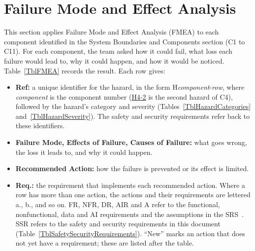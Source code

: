 \documentclass{article}
\newcommand{\hazref}[1]{\hyperref[haz:#1]{#1}}
\begin{document}
\section{Failure Mode and Effect Analysis} \label{sec_FMEA}


This section applies Failure Mode and Effect Analysis (FMEA) to each component
identified in the System Boundaries and Components section (C1 to C11). For each component,
the team asked how it could fail, what loss each failure would lead to, why it
could happen, and how it would be noticed. Table~\ref{TblFMEA} records the
result. Each row gives:

\begin{itemize}
  \item \textbf{Ref:} a unique identifier for the hazard, in the form
    H\textit{component}-\textit{row}, where \textit{component} is the
    component number (\hazref{H4-2} is the second hazard of C4), followed by the hazard's category and
    severity (Tables~\ref{TblHazardCategories} and~\ref{TblHazardSeverity}).
    The safety and security requirements refer back to these identifiers.
  \item \textbf{Failure Mode, Effects of Failure, Causes of Failure:} what goes
    wrong, the loss it leads to, and why it could happen.
  \item \textbf{Recommended Action:} how the failure is prevented or its effect
    is limited.
  \item \textbf{Req.:} the requirement that implements each recommended action.
    Where a row has more than one action, the actions and their requirements
    are lettered a., b., and so on. FR, NFR, DR, AIR and A refer to the
    functional, nonfunctional, data and AI requirements and the assumptions in
    the SRS~\citep{TeamBVSH2026SRS}. SSR refers to the safety and security requirements in this
    document (Table~\ref{TblSafetySecurityRequirements}). ``New'' marks an action that does not yet have a requirement;
    these are listed after the table.
\end{itemize}
\end{document}
